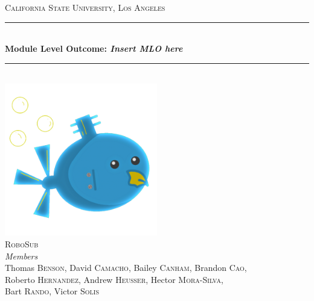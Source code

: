 \documentclass[11pt]{article}
\begin{document}
\begin{titlepage} 

	\newcommand{\HRule}{\rule{\linewidth}{0.5mm}} 
	\center %

	\textsc{\LARGE California State University, Los Angeles}\\[1.5cm] 

	\HRule\\[0.4cm]
    {\huge\bfseries Module Level Outcome: \emph{Insert MLO here}}\\[0.4cm] 
	\HRule\\[1.5cm]

	\vfill\vfill
	\includegraphics[width=0.5\textwidth]{robosub_logo.png}\\[1cm] 

	\textsc{\Large RoboSub}\\[0.5cm] 

	{\large\textit{Members}}\\
	Thomas \textsc{Benson},
	David \textsc{Camacho},
	Bailey \textsc{Canham},
	Brandon \textsc{Cao},\\
	Roberto \textsc{Hernandez},
	Andrew \textsc{Heusser},
    Hector \textsc{Mora-Silva},\\
	Bart \textsc{Rando},
	Victor \textsc{Solis}


\end{titlepage}
\end{document}
